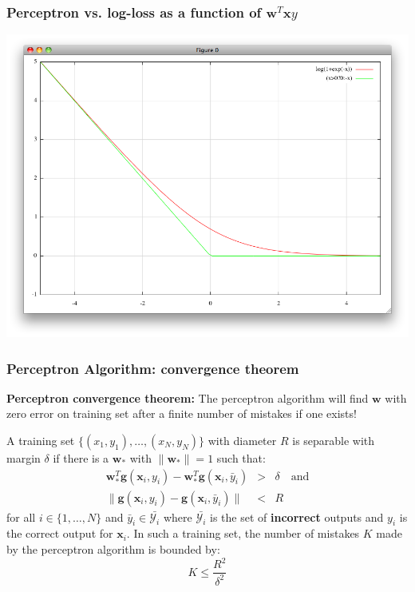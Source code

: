 \documentclass[ignorenonframetext,plain]{beamer}
\renewcommand{\vec}{\mathbf}
\begin{document}
\begin{frame}\frametitle{Perceptron vs. log-loss as a function of
    $\vec{w}^T\vec{x} y$}
\includegraphics[width=\textwidth]{images/perceptron-loss.png}
\end{frame}

\begin{frame}\frametitle{Perceptron Algorithm: convergence theorem}

{\bf Perceptron convergence theorem:} The perceptron algorithm will
find $\vec{w}$ with zero error on training set after a finite number
of mistakes if one exists!
\vspace{5mm}

A training set $\{(x_1,y_1),\dots,(x_N,y_N)\}$ with diameter $R$ is
separable with margin $\delta$ if there is a $\vec{w}_*$ with
$\|\vec{w}_*\|=1$ such that: \begin{eqnarray*}
  \vec{w}_*^T\vec{g}(\vec{x}_i,y_i) - \vec{w}_*^T\vec{g}(\vec{x}_i,\bar{y}_i)
  &>& \delta \quad\text{and}\\ \|\vec{g}(\vec{x}_i, y_i) -
  \vec{g}(\vec{x}_i, \bar{y}_i)\| &<& R
\end{eqnarray*}
for all $i \in \{1,\dots,N\}$ and $\bar{y}_i \in \bar{\mathcal{Y}_i}$ where
$\bar{\mathcal{Y}_i}$ is the set of {\bf incorrect} outputs and $y_i$
is the correct output for $\vec{x}_i$.  In such a training set, the
number of mistakes $K$ made by the perceptron algorithm is bounded
by: \[ K \leq \frac{R^2}{\delta^2}
\]
\end{frame}
\end{document}
